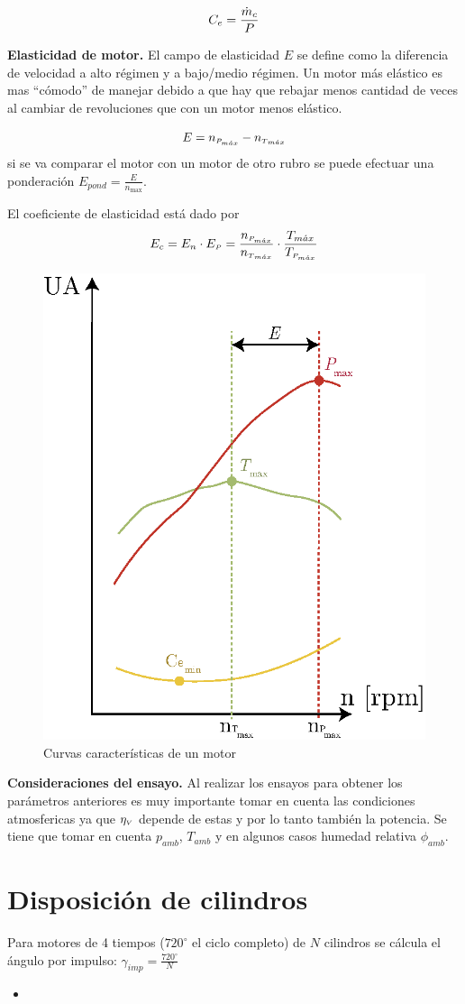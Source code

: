 \[
C_e = \frac{\dot{m}_c}{P}
\]

\textbf{Elasticidad de motor.} El campo de elasticidad $E$ se define como la diferencia de velocidad a alto régimen y a bajo/medio régimen. Un motor más elástico es mas ``cómodo'' de manejar debido a que hay que rebajar menos cantidad de veces al cambiar de revoluciones que con un motor menos elástico. 

\[
E = n_{{ \mbox{\tiny$P_{m\acute{a}x}$}}}-n_{{ \mbox{\tiny$T$}}_{{m\acute{a}x}}}
\]
si se va comparar el motor con un motor de otro rubro se puede efectuar una ponderación $E_{pond}=\frac{E}{n_{\max}}$.

El coeficiente de elasticidad está dado por
\[
E_c=E_n\cdot E_{ \mbox{\tiny$P$}} = \frac{n_{{ \mbox{\tiny$P_{m\acute{a}x}$}}}}{n_{{ \mbox{\tiny$T$}}_{m\acute{a}x}}} \cdot \frac{T_{{m\acute{a}x}}}{T_{{ \mbox{\tiny$P_{m\acute{a}x}$}}}}
\]

\begin{figure}
    \centering
    \includegraphics[width=.47\textwidth]{fig/curvaCaract.eps}
    \caption{Curvas características de un motor}
    \label{fig:curvacaract}
\end{figure}
\textbf{Consideraciones del ensayo.} Al realizar los ensayos para obtener los parámetros anteriores es muy importante tomar en cuenta las condiciones atmosfericas ya que $\eta_{{\mbox{\tiny$V$}}}$ depende de estas y por lo tanto también la potencia. Se tiene que tomar en cuenta $p_{amb}$, $T_{amb}$ y en algunos casos humedad relativa $\phi_{amb}$.
\section{Disposición de cilindros}
Para motores de 4 tiempos ($720^\circ$ el ciclo completo) de $N$ cilindros se cálcula el ángulo por impulso: $\gamma_{imp} = \frac{720^\circ}{N}$


\begin{itemize}
    \item 
\end{itemize}

